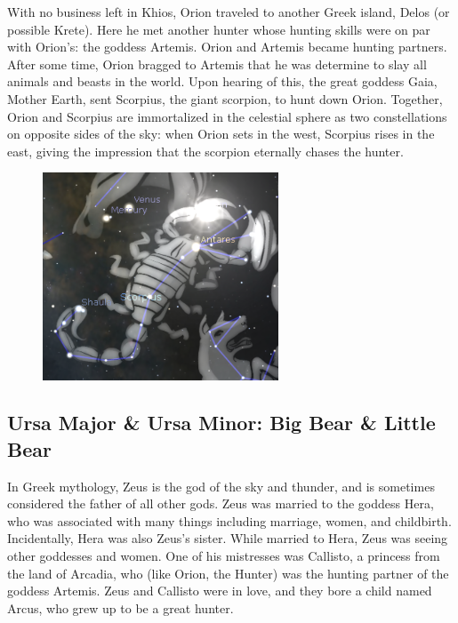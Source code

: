 \documentclass{article}
\numberwithin{equation}{section}
\numberwithin{figure}{section}
\begin{document}
\vspace{1ex}

With no business left in Khios, Orion traveled to another Greek island, Delos (or possible Krete). Here he met another hunter whose hunting skills were on par with Orion's: the goddess Artemis. Orion and Artemis became hunting partners. After some time, Orion bragged to Artemis that he was determine to slay all animals and beasts in the world. Upon hearing of this, the great goddess Gaia, Mother Earth, sent Scorpius, the giant scorpion, to hunt down Orion. Together, Orion and Scorpius are immortalized in the celestial sphere as two constellations on opposite sides of the sky: when Orion sets in the west, Scorpius rises in the east, giving the impression that the scorpion eternally chases the hunter.


\begin{figure}[h!]
    \centering
    \includegraphics[width=7cm]{Figures/Scorpius.png}
\end{figure}

\subsection{Ursa Major \& Ursa Minor: Big Bear \& Little Bear}
In Greek mythology, Zeus is the god of the sky and thunder, and is sometimes considered the father of all other gods. Zeus was married to the goddess Hera, who was associated with many things including marriage, women, and childbirth. Incidentally, Hera was also Zeus's sister. While married to Hera, Zeus was seeing other goddesses and women. One of his mistresses was Callisto, a princess from the land of Arcadia, who (like Orion, the Hunter) was the hunting partner of the goddess Artemis. Zeus and Callisto were in love, and they bore a child named Arcus, who grew up to be a great hunter.

\vspace{1ex}
\end{document}
